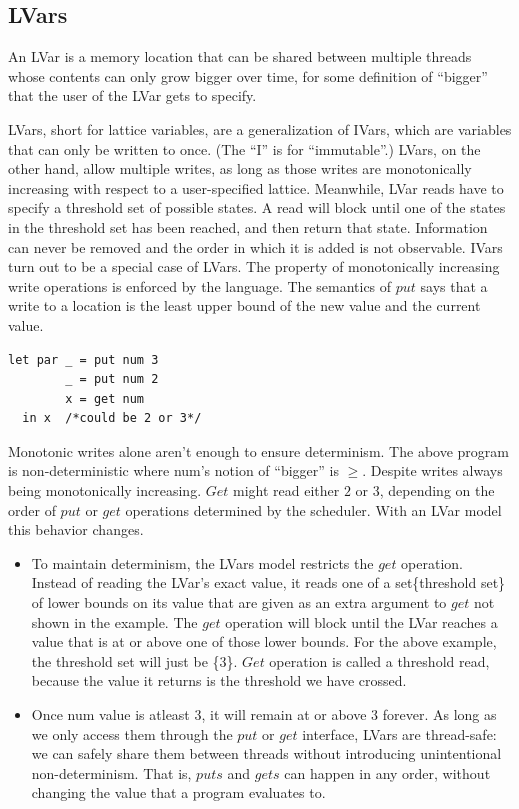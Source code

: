 \documentclass[twocolumn]{article}
\begin{document}
\subsection{LVars}
An LVar is a memory location that can be shared between multiple threads whose contents can only grow bigger over time, for some definition of “bigger” that the user of the LVar gets to specify. \par
LVars, short for lattice variables, are a generalization of IVars, which are variables that can only be written to once. (The “I” is for “immutable”.) LVars, on the other hand, allow multiple writes, as long as those writes are monotonically increasing with respect to a user-specified lattice. Meanwhile, LVar reads have to specify a threshold set of possible states. A read will block until one of the states in the threshold set has been reached, and then return that state. Information can never be removed and the order in which it is added is not observable. IVars turn out to be a special case of LVars. 
The property of monotonically increasing write operations is enforced by the language. The semantics of $put$ says that a write to a location is the least upper bound of the new value and the current value. 
\begin{verbatim}
let par _ = put num 3
        _ = put num 2
        x = get num
  in x  /*could be 2 or 3*/
\end{verbatim}
Monotonic writes alone aren't enough to ensure determinism. The above program is non-deterministic where num's notion of “bigger” is $\geq$. Despite writes always being monotonically increasing. $Get$ might read either $2$ or $3$, depending on the order of $put$ or $get$ operations determined by the scheduler. With an LVar model this behavior changes.\par
\begin{itemize}
\item To maintain determinism, the LVars model restricts the $get$ operation. Instead of reading the LVar’s exact value, it reads one of a set\{threshold set\} of lower bounds on its value that are given as an extra argument to $get$ not shown in the example. The $get$ operation will block until the LVar reaches a value that is at or above one of those lower bounds. For the above example, the threshold set will just be \{$3$\}. $Get$ operation is called a threshold read, because the value it returns is the threshold we have crossed.
\item Once num value is atleast $3$, it will remain at or above $3$ forever. As long as we only access them through the $put$ or $get$ interface, LVars are thread-safe: we can safely share them between threads without introducing unintentional non-determinism. That is, $puts$ and $gets$ can happen in any order, without changing the value that a program evaluates to.
\end{itemize}
\end{document}
